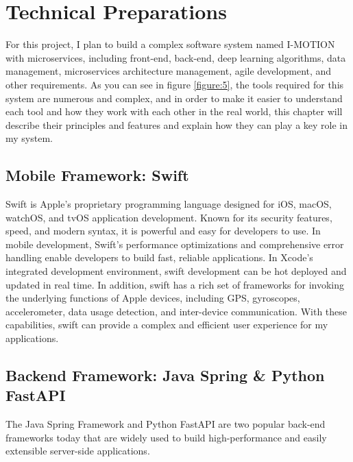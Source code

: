 \documentclass[12pt,two side]{report}
\begin{document}
\chapter{Technical Preparations}
For this project, I plan to build a complex software system named I-MOTION with microservices, including front-end, back-end, deep learning algorithms, data management, microservices architecture management, agile development, and other requirements. As you can see in figure \ref{figure:5}, the tools required for this system are numerous and complex, and in order to make it easier to understand each tool and how they work with each other in the real world, this chapter will describe their principles and features and explain how they can play a key role in my system.
\section{Mobile Framework: Swift}

Swift is Apple's proprietary programming language designed for iOS, macOS, watchOS, and tvOS application development\cite{swift}. Known for its security features, speed, and modern syntax, it is powerful and easy for developers to use. In mobile development, Swift's performance optimizations and comprehensive error handling enable developers to build fast, reliable applications.\cite{swift} In Xcode's integrated development environment, swift development can be hot deployed and updated in real time\cite{swift}. In addition, swift has a rich set of frameworks for invoking the underlying functions of Apple devices, including GPS, gyroscopes, accelerometer, data usage detection, and inter-device communication\cite{swift}. With these capabilities, swift can provide a complex and efficient user experience for my applications.

\section{Backend Framework: Java Spring \& Python FastAPI}
The Java Spring Framework and Python FastAPI are two popular back-end frameworks today that are widely used to build high-performance and easily extensible server-side applications.\newline
\end{document}
